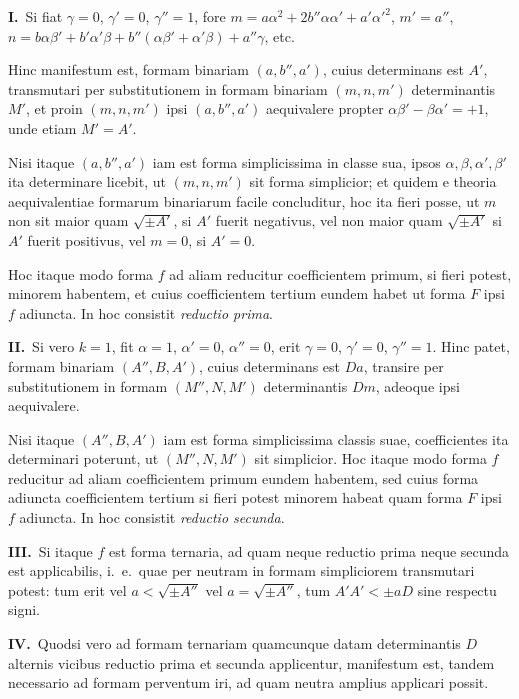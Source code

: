 \documentclass[12pt,a4paper]{article}
\theoremstyle{plain}
\theoremstyle{definition}
\theoremstyle{remark}
\begin{document}
\textbf{I.}\ Si fiat $\gamma = 0$, $\gamma' = 0$, $\gamma'' = 1$, fore $m = a\alpha^2 + 2b''\alpha\alpha' + a'\alpha'^2$, $m' = a''$, $n = b\alpha\beta' + b'\alpha'\beta + b''(\alpha\beta' + \alpha'\beta) + a''\gamma$, etc.

Hinc manifestum est, formam binariam $(a, b'', a')$, cuius determinans est $A'$, transmutari per substitutionem in formam binariam $(m, n, m')$ determinantis $M'$, et proin $(m,n,m')$ ipsi $(a,b'',a')$ aequivalere propter $\alpha\beta' - \beta\alpha' = +1$, unde etiam $M' = A'$.

Nisi itaque $(a, b'', a')$ iam est forma simplicissima in classe sua, ipsos $\alpha, \beta, \alpha', \beta'$ ita determinare licebit, ut $(m, n, m')$ sit forma simplicior; et quidem e theoria aequivalentiae formarum binariarum facile concluditur, hoc ita fieri posse, ut $m$ non sit maior quam $\sqrt{\pm A'}$, si $A'$ fuerit negativus, vel non maior quam $\sqrt{\pm A'}$ si $A'$ fuerit positivus, vel $m = 0$, si $A' = 0$.

Hoc itaque modo forma $f$ ad aliam reducitur coefficientem primum, si fieri potest, minorem habentem, et cuius coefficientem tertium eundem habet ut forma $F$ ipsi $f$ adiuncta. In hoc consistit \emph{reductio prima}.

\textbf{II.}\ Si vero $k = 1$, fit $\alpha = 1$, $\alpha' = 0$, $\alpha'' = 0$, erit $\gamma = 0$, $\gamma' = 0$, $\gamma'' = 1$. Hinc patet, formam binariam $(A'', B, A')$, cuius determinans est $Da$, transire per substitutionem in formam $(M'', N, M')$ determinantis $Dm$, adeoque ipsi aequivalere.

Nisi itaque $(A'', B, A')$ iam est forma simplicissima classis suae, coefficientes ita determinari poterunt, ut $(M'', N, M')$ sit simplicior. Hoc itaque modo forma $f$ reducitur ad aliam coefficientem primum eundem habentem, sed cuius forma adiuncta coefficientem tertium si fieri potest minorem habeat quam forma $F$ ipsi $f$ adiuncta. In hoc consistit \emph{reductio secunda}.

\textbf{III.}\ Si itaque $f$ est forma ternaria, ad quam neque reductio prima neque secunda est applicabilis, i.\ e.\ quae per neutram in formam simpliciorem transmutari potest: tum erit vel $a < \sqrt{\pm A''}$ vel $a = \sqrt{\pm A''}$, tum $A'A' < \pm aD$ sine respectu signi.

\textbf{IV.}\ Quodsi vero ad formam ternariam quamcunque datam determinantis $D$ alternis vicibus reductio prima et secunda applicentur, manifestum est, tandem necessario ad formam perventum iri, ad quam neutra amplius applicari possit.
\end{document}
